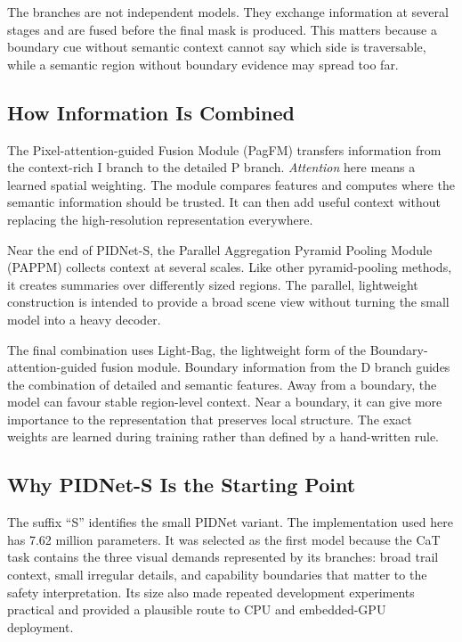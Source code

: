 The branches are not independent models. They exchange information at several
stages and are fused before the final mask is produced. This matters because a
boundary cue without semantic context cannot say which side is traversable,
while a semantic region without boundary evidence may spread too far.

\subsection{How Information Is Combined}

The Pixel-attention-guided Fusion Module (PagFM) transfers information from
the context-rich I branch to the detailed P branch. \emph{Attention} here
means a learned spatial weighting. The module compares features and computes
where the semantic information should be trusted. It can then add useful
context without replacing the high-resolution representation everywhere.

Near the end of PIDNet-S, the Parallel Aggregation Pyramid Pooling Module
(PAPPM) collects context at several scales. Like other pyramid-pooling
methods, it creates summaries over differently sized regions. The parallel,
lightweight construction is intended to provide a broad scene view without
turning the small model into a heavy decoder.

The final combination uses Light-Bag, the lightweight form of the
Boundary-attention-guided fusion module. Boundary information from the D
branch guides the combination of detailed and semantic features. Away from a
boundary, the model can favour stable region-level context. Near a boundary,
it can give more importance to the representation that preserves local
structure. The exact weights are learned during training rather than defined
by a hand-written rule.

\subsection{Why PIDNet-S Is the Starting Point}

The suffix ``S'' identifies the small PIDNet variant. The implementation used
here has 7.62 million parameters. It was selected as the first model because
the CaT task contains the three visual demands represented by its branches:
broad trail context, small irregular details, and capability boundaries that
matter to the safety interpretation. Its size also made repeated development
experiments practical and provided a plausible route to CPU and embedded-GPU
deployment.

